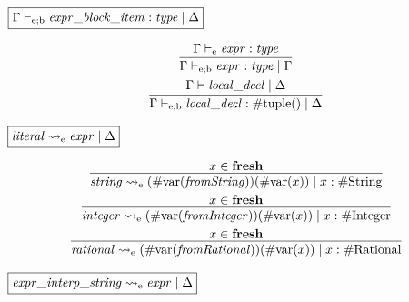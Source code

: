 $\fbox{$\Gamma \vdash_{\mathrm{e}; \mathrm{b}} \mathit{expr\_block\_item}: \mathit{type} \mid \Delta$}$

\begin{gather*}
    \infer{\Gamma \vdash_{\mathrm{e}; \mathrm{b}} \mathit{expr}: \mathit{type} \mid \Gamma}{
        \Gamma \vdash_\mathrm{e} \mathit{expr}: \mathit{type}
    }
    \\
    \infer{\Gamma \vdash_{\mathrm{e}; \mathrm{b}} \mathit{local\_decl}: \mathrm{\#tuple}() \mid \Delta}{
        \Gamma \vdash \mathit{local\_decl} \mid \Delta
    }
\end{gather*}

$\fbox{$\mathit{literal} \rightsquigarrow_\mathrm{e} \mathit{expr} \mid \Delta$}$

\begin{gather*}
    \infer{\mathit{string} \rightsquigarrow_\mathrm{e} (\mathrm{\#var}(\mathit{fromString}))(\mathrm{\#var}(x)) \mid x: \mathrm{\#String}}{
        x \in \mathbf{fresh}
    }
    \\
    \infer{\mathit{integer} \rightsquigarrow_\mathrm{e} (\mathrm{\#var}(\mathit{fromInteger}))(\mathrm{\#var}(x)) \mid x: \mathrm{\#Integer}}{
        x \in \mathbf{fresh}
    }
    \\
    \infer{\mathit{rational} \rightsquigarrow_\mathrm{e} (\mathrm{\#var}(\mathit{fromRational}))(\mathrm{\#var}(x)) \mid x: \mathrm{\#Rational}}{
        x \in \mathbf{fresh}
    }
\end{gather*}

$\fbox{$\mathit{expr\_interp\_string} \rightsquigarrow_\mathrm{e} \mathit{expr} \mid \Delta$}$


